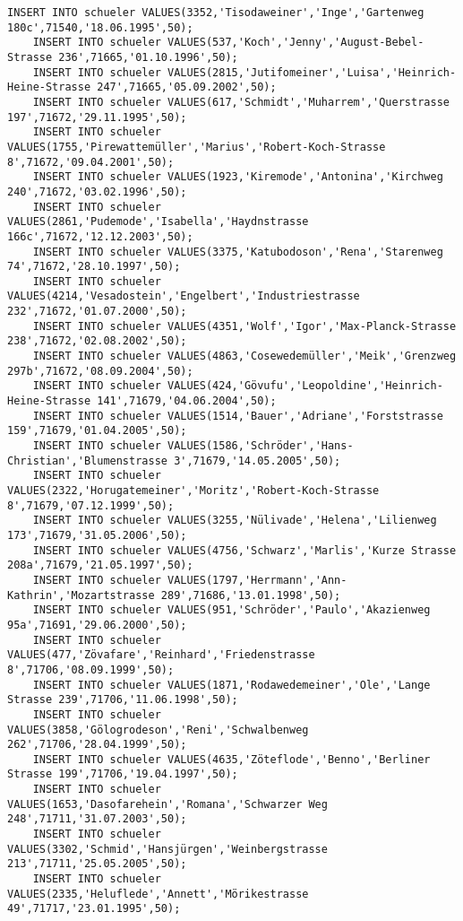 \begin{lstlisting}[breaklines=True, numbers=none, basicstyle=\tiny, keepspaces=false]
	INSERT INTO schueler VALUES(3352,'Tisodaweiner','Inge','Gartenweg 180c',71540,'18.06.1995',50);
	INSERT INTO schueler VALUES(537,'Koch','Jenny','August-Bebel-Strasse 236',71665,'01.10.1996',50);
	INSERT INTO schueler VALUES(2815,'Jutifomeiner','Luisa','Heinrich-Heine-Strasse 247',71665,'05.09.2002',50);
	INSERT INTO schueler VALUES(617,'Schmidt','Muharrem','Querstrasse 197',71672,'29.11.1995',50);
	INSERT INTO schueler VALUES(1755,'Pirewattemüller','Marius','Robert-Koch-Strasse 8',71672,'09.04.2001',50);
	INSERT INTO schueler VALUES(1923,'Kiremode','Antonina','Kirchweg 240',71672,'03.02.1996',50);
	INSERT INTO schueler VALUES(2861,'Pudemode','Isabella','Haydnstrasse 166c',71672,'12.12.2003',50);
	INSERT INTO schueler VALUES(3375,'Katubodoson','Rena','Starenweg 74',71672,'28.10.1997',50);
	INSERT INTO schueler VALUES(4214,'Vesadostein','Engelbert','Industriestrasse 232',71672,'01.07.2000',50);
	INSERT INTO schueler VALUES(4351,'Wolf','Igor','Max-Planck-Strasse 238',71672,'02.08.2002',50);
	INSERT INTO schueler VALUES(4863,'Cosewedemüller','Meik','Grenzweg 297b',71672,'08.09.2004',50);
	INSERT INTO schueler VALUES(424,'Gövufu','Leopoldine','Heinrich-Heine-Strasse 141',71679,'04.06.2004',50);
	INSERT INTO schueler VALUES(1514,'Bauer','Adriane','Forststrasse 159',71679,'01.04.2005',50);
	INSERT INTO schueler VALUES(1586,'Schröder','Hans-Christian','Blumenstrasse 3',71679,'14.05.2005',50);
	INSERT INTO schueler VALUES(2322,'Horugatemeiner','Moritz','Robert-Koch-Strasse 8',71679,'07.12.1999',50);
	INSERT INTO schueler VALUES(3255,'Nülivade','Helena','Lilienweg 173',71679,'31.05.2006',50);
	INSERT INTO schueler VALUES(4756,'Schwarz','Marlis','Kurze Strasse 208a',71679,'21.05.1997',50);
	INSERT INTO schueler VALUES(1797,'Herrmann','Ann-Kathrin','Mozartstrasse 289',71686,'13.01.1998',50);
	INSERT INTO schueler VALUES(951,'Schröder','Paulo','Akazienweg 95a',71691,'29.06.2000',50);
	INSERT INTO schueler VALUES(477,'Zövafare','Reinhard','Friedenstrasse 8',71706,'08.09.1999',50);
	INSERT INTO schueler VALUES(1871,'Rodawedemeiner','Ole','Lange Strasse 239',71706,'11.06.1998',50);
	INSERT INTO schueler VALUES(3858,'Gölogrodeson','Reni','Schwalbenweg 262',71706,'28.04.1999',50);
	INSERT INTO schueler VALUES(4635,'Zöteflode','Benno','Berliner Strasse 199',71706,'19.04.1997',50);
	INSERT INTO schueler VALUES(1653,'Dasofarehein','Romana','Schwarzer Weg 248',71711,'31.07.2003',50);
	INSERT INTO schueler VALUES(3302,'Schmid','Hansjürgen','Weinbergstrasse 213',71711,'25.05.2005',50);
	INSERT INTO schueler VALUES(2335,'Heluflede','Annett','Mörikestrasse 49',71717,'23.01.1995',50);

\end{lstlisting}
